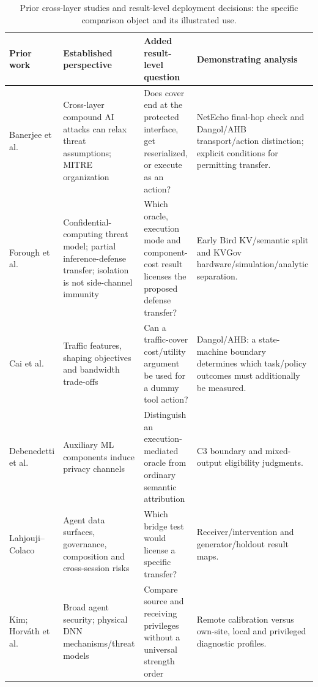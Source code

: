 \begin{table}[t]\centering\footnotesize
\caption{Prior cross-layer studies and result-level deployment decisions: the specific comparison object and its illustrated use.}\label{tab:related-sok-matrix}
\begin{tabularx}{\textwidth}{@{}p{}YYY@{}}\toprule
Prior work & Established perspective & Added result-level question & Demonstrating analysis\\\midrule
Banerjee et al. \cite{banerjee2024compound} & Cross-layer compound AI attacks can relax threat assumptions; MITRE organization & Does cover end at the protected interface, get reserialized, or execute as an action? & NetEcho final-hop check and Dangol/AHB transport/action distinction; explicit conditions for permitting transfer.\\
Forough et al. \cite{forough2026secrets} & Confidential-computing threat model; partial inference-defense transfer; isolation is not side-channel immunity & Which oracle, execution mode and component-cost result licenses the proposed defense transfer? & Early Bird KV/semantic split and KVGov hardware/simulation/analytic separation.\\
Cai et al. \cite{cai2014systematic} & Traffic features, shaping objectives and bandwidth trade-offs & Can a traffic-cover cost/utility argument be used for a dummy tool action? & Dangol/AHB: a state-machine boundary determines which task/policy outcomes must additionally be measured.\\
Debenedetti et al. \cite{debenedetti2024privacy} & Auxiliary ML components induce privacy channels & Distinguish an execution-mediated oracle from ordinary semantic attribution & C3 boundary and mixed-output eligibility judgments.\\
Lahjouji--Colaco \cite{lahjouji2026datacentric} & Agent data surfaces, governance, composition and cross-session risks & Which bridge test would license a specific transfer? & Receiver/intervention and generator/holdout result maps.\\
Kim; Horv\'ath et al. \cite{kim2026agenticsok,horvath2024physical} & Broad agent security; physical DNN mechanisms/threat models & Compare source and receiving privileges without a universal strength order & Remote calibration versus own-site, local and privileged diagnostic profiles.\\\bottomrule
\end{tabularx}\end{table}
